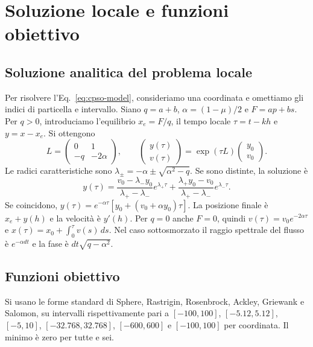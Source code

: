 \section{Soluzione locale e funzioni obiettivo}
\label{app:dynamics}

\subsection{Soluzione analitica del problema locale}
Per risolvere l’Eq.~\eqref{eq:cpso-model}, consideriamo una coordinata e omettiamo gli indici di particella e intervallo. Siano $q=a+b$, $\alpha=(1-\mu)/2$ e $F=ap+bs$. Per $q>0$, introduciamo l'equilibrio $x_e=F/q$, il tempo locale $\tau=t-kh$ e $y=x-x_e$. Si ottengono
\begin{equation}
 L=\begin{pmatrix}0&1\\-q&-2\alpha\end{pmatrix},\qquad
 \begin{pmatrix}y(\tau)\\ v(\tau)\end{pmatrix}
 =\exp(\tau L)\begin{pmatrix}y_0\\v_0\end{pmatrix}.
\end{equation}
Le radici caratteristiche sono $\lambda_\pm=-\alpha\pm\sqrt{\alpha^2-q}$. Se sono distinte, la soluzione è
\begin{equation}
 y(\tau)=\frac{v_0-\lambda_-y_0}{\lambda_+-\lambda_-}e^{\lambda_+\tau}
 +\frac{\lambda_+y_0-v_0}{\lambda_+-\lambda_-}e^{\lambda_-\tau}.
\end{equation}
Se coincidono, $y(\tau)=e^{-\alpha\tau}[y_0+(v_0+\alpha y_0)\tau]$. La posizione finale è $x_e+y(h)$ e la velocità è $y'(h)$. Per $q=0$ anche $F=0$, quindi $v(\tau)=v_0 e^{-2\alpha\tau}$ e $x(\tau)=x_0+\int_0^\tau v(s)\,ds$. Nel caso sottosmorzato il raggio spettrale del flusso è $e^{-\alpha dt}$ e la fase è $dt\sqrt{q-\alpha^2}$.

\subsection{Funzioni obiettivo}
Si usano le forme standard di Sphere, Rastrigin, Rosenbrock, Ackley, Griewank e Salomon, su intervalli rispettivamente pari a $[-100,100]$, $[-5.12,5.12]$, $[-5,10]$, $[-32.768,32.768]$, $[-600,600]$ e $[-100,100]$ per coordinata. Il minimo è zero per tutte e sei.

